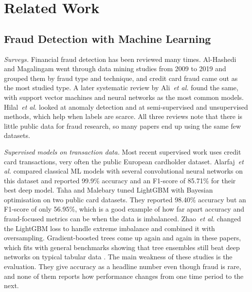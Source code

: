 \section{Related Work}
\label{sec:related}

\subsection{Fraud Detection with Machine Learning}
\label{sec:related-fraud}

\textit{Surveys.} Financial fraud detection has been reviewed many times. Al-Hashedi and
Magalingam \cite{alhashedi2021financial} went through data mining studies from 2009 to 2019 and
grouped them by fraud type and technique, and credit card fraud came out as the most studied type.
A later systematic review by Ali~\textit{et al.} \cite{ali2022financial} found the same, with
support vector machines and neural networks as the most common models. Hilal~\textit{et al.}
\cite{hilal2022financial} looked at anomaly detection and at semi-supervised and unsupervised
methods, which help when labels are scarce. All three reviews note that there is little public data
for fraud research, so many papers end up using the same few datasets.

\textit{Supervised models on transaction data.} Most recent supervised work uses credit card
transactions, very often the public European cardholder dataset. Alarfaj~\textit{et al.}
\cite{alarfaj2022credit} compared classical ML models with several convolutional neural networks on
this dataset and reported 99.9\% accuracy and an F1-score of 85.71\% for their best deep model.
Taha and Malebary \cite{taha2020intelligent} tuned LightGBM with Bayesian optimisation on two public
card datasets. They reported 98.40\% accuracy but an F1-score of only 56.95\%, which is a good
example of how far apart accuracy and fraud-focused metrics can be when the data is imbalanced.
Zhao~\textit{et al.} \cite{zhao2024improved} changed the LightGBM loss to handle extreme imbalance
and combined it with oversampling. Gradient-boosted trees come up again and again in these papers,
which fits with general benchmarks showing that tree ensembles still beat deep networks on typical
tabular data \cite{grinsztajn2022tree, shwartzziv2022tabular}. The main weakness of these studies is
the evaluation. They give accuracy as a headline number even though fraud is rare, and none of them
reports how performance changes from one time period to the next.

